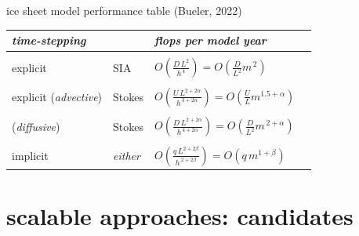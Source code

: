 \documentclass[svgnames,
               hyperref={colorlinks,citecolor=DeepPink4,linkcolor=FireBrick,urlcolor=Maroon},
               usepdftitle=false]  %
               {beamer}
\newcommand{\oo}[1]{\displaystyle O\left(#1\right)}
\begin{document}
\begin{frame}{ice sheet model performance table (Bueler, 2022)}

\begin{tabular}{llll}
\emph{time-stepping} &  & \emph{flops per model year} \\ \hline
\\
explicit & SIA    & $\oo{\frac{D\, L^2}{h^{\,4}}} = \oo{\frac{D}{L^2} m^{\,2}}$ \\
\\
explicit ({\footnotesize \emph{advective}}) & Stokes & $\oo{\frac{U \,L^{2+2\alpha}}{h^{\,3+2\alpha}}} = \oo{\frac{U}{L} m^{1.5+\alpha}}$ \\
\\
\phantom{explicit} ({\footnotesize \emph{diffusive}})  & Stokes & $\oo{\frac{D\, L^{2+2\alpha}}{h^{\,4+2\alpha}}} = \oo{\frac{D}{L^2} m^{\,2+\alpha}}$ \\
\\
implicit & \emph{either} & $\oo{\frac{q\, L^{2+2\beta}}{h^{\,2+2\beta}}} = \oo{q\, m^{1+\beta}}$
\end{tabular}
\end{frame}


\section{scalable approaches: candidates}
\end{document}
